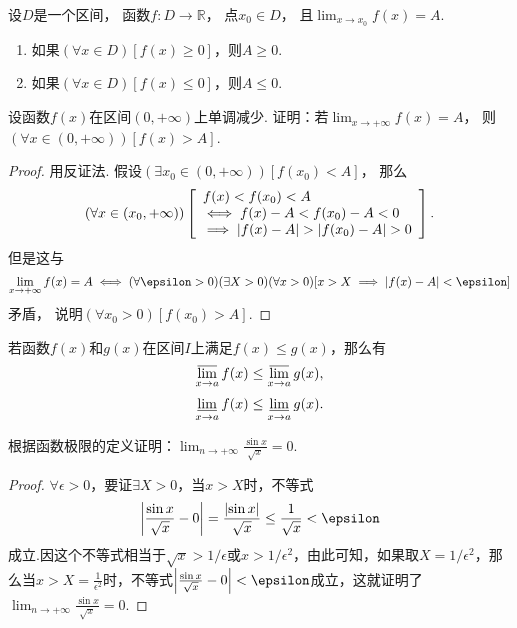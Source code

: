 \begin{corollary}\label{theorem:极限.函数极限的局部保号性3}
设\(D\)是一个区间，
函数\(f\colon D\to\mathbb{R}\)，
点\(x_0 \in D\)，
且\(\lim_{x \to x_0} f(x) = A\).
\begin{enumerate}
	\item 如果\((\forall x \in D)[f(x) \geq 0]\)，则\(A \geq 0\).
	\item 如果\((\forall x \in D)[f(x) \leq 0]\)，则\(A \leq 0\).
\end{enumerate}
\end{corollary}

\begin{example}
设函数\(f(x)\)在区间\((0,+\infty)\)上单调减少.
证明：若\(\lim_{x\to+\infty} f(x) = A\)，
则\((\forall x\in(0,+\infty))[f(x)>A]\).
\begin{proof}
用反证法.
假设\((\exists x_0\in(0,+\infty))[f(x_0)<A]\)，
那么\[
	(\forall x\in(x_0,+\infty))
	\left[
		\begin{array}{l}
			f(x)<f(x_0)<A \\
			\iff
			f(x) - A < f(x_0) - A < 0 \\
			\implies
			\abs{f(x) - A} > \abs{f(x_0) - A} > 0
		\end{array}
	\right].
\]
但是这与\[
	\lim_{x\to+\infty} f(x) = A
	\iff
	(\forall \epsilon>0)
	(\exists X>0)
	(\forall x>0)
	[
		x > X
		\implies
		\abs{f(x) - A} < \epsilon
	]
\]矛盾，
说明\((\forall x_0 > 0)[f(x_0) > A]\).
\end{proof}
\end{example}

\begin{theorem}[函数极限的保序性]\label{theorem:极限.函数极限的保序性}
若函数\(f(x)\)和\(g(x)\)在区间\(I\)上满足\(f(x) \leq g(x)\)，那么有\[
	\varlimsup_{x \to a} f(x) \leq \varlimsup_{x \to a} g(x),
\]\[
	\varliminf_{x \to a} f(x) \leq \varliminf_{x \to a} g(x).
\]
\end{theorem}

\begin{example}
\def\l{\lim_{n\to+\infty}}
根据函数极限的定义证明：\(\l\frac{\sin x}{\sqrt x} = 0\).
\begin{proof}
\(\forall \epsilon>0\)，要证\(\exists X > 0\)，当\(x > X\)时，不等式\[
\abs{\frac{\sin x}{\sqrt x} - 0} = \frac{\abs{\sin x}}{\sqrt x}
\leq \frac{1}{\sqrt x} < \epsilon
\]成立.因这个不等式相当于\(\sqrt x > 1/\epsilon\)或\(x > 1/\epsilon^2\)，由此可知，如果取\(X = 1/\epsilon^2\)，那么当\(x > X = \frac{1}{\epsilon^2}\)时，不等式\(\abs{\frac{\sin x}{\sqrt x} - 0} < \epsilon\)成立，这就证明了\(\l\frac{\sin x}{\sqrt x} = 0\).
\end{proof}
\end{example}


